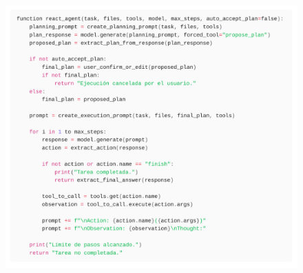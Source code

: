 \begin{figure}[h!]
    \centering
    \includegraphics[width=1.0\textwidth]{figures/pseudoReAct.pdf}

    


\end{figure}
